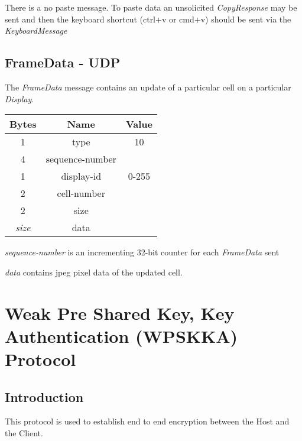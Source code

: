 \documentclass{article}
\begin{document}
    There is a no paste message. To paste data an unsolicited \emph{CopyResponse} may be sent and then the keyboard
    shortcut (ctrl+v or cmd+v) should be sent via the \emph{KeyboardMessage}

    \subsection{FrameData - UDP}
    The \emph{FrameData} message contains an update of a particular cell on a particular \emph{Display}.

    \begin{center}
        \begin{tabular}{|c|c|c|}
            \hline
            \textbf{Bytes} & \textbf{Name}   & \textbf{Value} \\
            \hline
            1              & type            & 10             \\
            \hline
            4              & sequence-number &                \\
            \hline
            1              & display-id      & 0-255          \\
            \hline
            2              & cell-number     &                \\
            \hline
            2              & size            &                \\
            \hline
            \emph{size}    & data            &                \\
            \hline
        \end{tabular}
    \end{center}

    \emph{sequence-number} is an incrementing 32-bit counter for each \emph{FrameData} sent

    \emph{data} contains jpeg pixel data of the updated cell.

    \newpage


    \section{Weak Pre Shared Key, Key Authentication (WPSKKA) Protocol}

    \subsection{Introduction}

    This protocol is used to establish end to end encryption between the Host and the Client.
\end{document}
